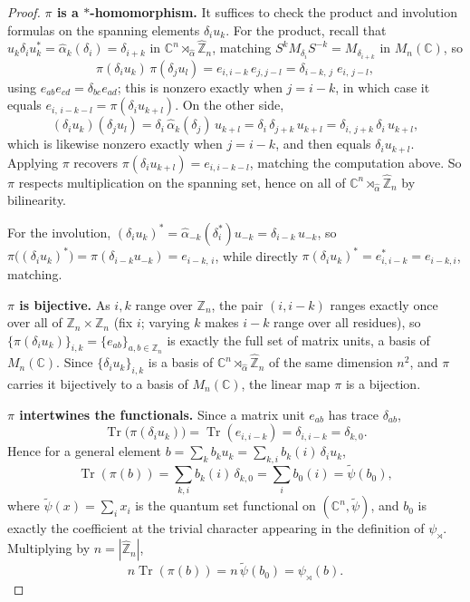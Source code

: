 \begin{proof}
    \textbf{\( \pi \) is a \( * \)-homomorphism.} It suffices to check
    the product and involution formulas on the spanning elements
    \( \delta_i u_k \). For the product, recall that
    \( u_k \delta_i u_k^* = \widehat\alpha_k(\delta_i) = \delta_{i+k} \) in
    \( \mathbb{C}^n \rtimes_{\widehat\alpha}\widehat{\mathbb{Z}}_n \), matching
    \( S^k M_{\delta_i} S^{-k} = M_{\delta_{i+k}} \) in \( M_n
    (\mathbb{C}) \), so
    \[
        \pi(\delta_i u_k)\,\pi(\delta_j u_l)
        = e_{i,i-k}\, e_{j,j-l}
        = \delta_{i-k,\,j}\; e_{i,\,j-l},
    \]
    using \( e_{ab}e_{cd} = \delta_{bc}e_{ad} \); this is nonzero
    exactly when \( j = i-k \), in which case it equals
    \( e_{i,\,i-k-l} = \pi(\delta_i u_{k+l}) \). On the other side,
    \[
        (\delta_i u_k)(\delta_j u_l) = \delta_i\,
        \widehat\alpha_k(\delta_j)\, u_{k+l}
        = \delta_i\,\delta_{j+k}\,u_{k+l} = \delta_{i,\,j+k}\,\delta_i\,u_{k+l},
    \]
    which is likewise nonzero exactly when \( j = i-k \), and then
    equals \( \delta_i u_{k+l} \). Applying \( \pi \) recovers
    \( \pi(\delta_i u_{k+l}) = e_{i,i-k-l} \), matching the computation
    above. So \( \pi \) respects multiplication on the spanning set,
    hence on all of \(
    \mathbb{C}^n\rtimes_{\widehat\alpha}\widehat{\mathbb{Z}}_n \)
    by bilinearity.

    For the involution, \( (\delta_i u_k)^* =
        \widehat\alpha_{-k}(\delta_i^*)u_{-k}
    = \delta_{i-k}\,u_{-k} \), so \( \pi\big((\delta_i u_k)^*\big) =
    \pi(\delta_{i-k}u_{-k}) = e_{i-k,\,i} \), while directly
    \( \pi(\delta_i u_k)^* = e_{i,i-k}^* = e_{i-k,i} \), matching.

    \textbf{\( \pi \) is bijective.} As \( i,k \) range over
    \( \mathbb{Z}_n \), the pair \( (i,i-k) \) ranges exactly once over
    all of \( \mathbb{Z}_n\times\mathbb{Z}_n \) (fix \( i \); varying
    \( k \) makes \( i-k \) range over all residues), so
    \( \{\pi(\delta_i u_k)\}_{i,k} = \{e_{ab}\}_{a,b\in\mathbb{Z}_n} \)
    is exactly the full set of matrix units, a basis of \( M_n
    (\mathbb{C}) \). Since \( \{\delta_i u_k\}_{i,k} \) is a basis of
    \( \mathbb{C}^n\rtimes_{\widehat\alpha}\widehat{\mathbb{Z}}_n \) of the
    same dimension \( n^2 \), and \( \pi \) carries it bijectively to a
    basis of \( M_n (\mathbb{C}) \), the linear map \(
    \pi \) is a bijection.

    \textbf{\( \pi \) intertwines the functionals.} Since a matrix
    unit \( e_{ab} \) has trace \( \delta_{ab} \),
    \[
        \operatorname{Tr}\big(\pi(\delta_i u_k)\big) =
        \operatorname{Tr}(e_{i,i-k}) = \delta_{i,i-k} = \delta_{k,0}.
    \]
    Hence for a general element \( b=\sum_k b_k u_k =
    \sum_{k,i}b_k(i)\,\delta_i u_k \),
    \[
        \operatorname{Tr}(\pi(b)) = \sum_{k,i}b_k(i)\,\delta_{k,0}
        = \sum_i b_0(i) = \widetilde\psi(b_0),
    \]
    where \( \widetilde\psi(x) = \sum_i x_i \) is the quantum set functional
    on \( (\mathbb{C}^n,\widetilde\psi) \), and \( b_0 \) is exactly the
    coefficient at the trivial character appearing in the definition of
    \( \psi_\rtimes \). Multiplying by \( n = |\widehat{\mathbb{Z}}_n| \),
    \[
        n\operatorname{Tr}(\pi(b)) = n\,\widetilde\psi(b_0) = \psi_\rtimes(b).
    \]


\end{proof}
